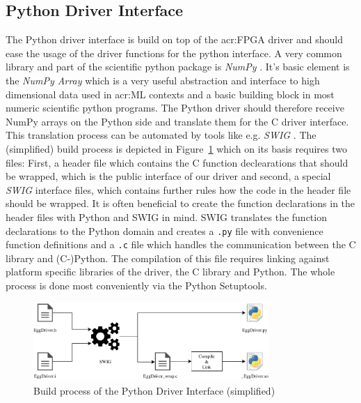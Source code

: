 \subsection{Python Driver Interface}
\label{sec:sw-python}

The Python driver interface is build on top of the \gls{acr:FPGA} driver and should ease the usage of the driver functions for the python interface. A very common library and part of the scientific python package is \emph{NumPy} \cite{Virtanen:2020aa}. It's basic element is the \emph{NumPy Array} \cite{Walt:2011aa} which is a very useful abstraction and interface to high dimensional data used in \gls{acr:ML} contexts and a basic building block in most numeric scientific python programs. The Python driver should therefore receive NumPy arrays on the Python side and translate them for the C driver interface. 
This translation process can be automated by tools like e.g. \emph{SWIG} \cite{Beazley:2003aa}.	The (simplified) build process is depicted in Figure~\ref{fig:sw-python-eggdriver-build} which on its basis requires two files: 
First, a header file which contains the C function declearations that should be wrapped, which is the public interface of our driver and second, a special \emph{SWIG} interface files, which contains further rules how the code in the header file should be wrapped. It is often beneficial to create the function declarations in the header files with Python and SWIG in mind. 
SWIG translates the function declarations to the Python domain and creates a \texttt{.py} file with convenience function definitions and a \texttt{.c} file which handles the communication between the C library and (C-)Python. The compilation of this file requires linking against platform specific libraries of the driver, the C library and Python. The whole process is done most conveniently via the Python Setuptools.

\begin{figure}[hbt]
  \centering
  \includegraphics[width=0.8\textwidth]{img/pydriver.pdf}
  \caption{Build process of the Python Driver Interface (simplified)}
  \label{fig:sw-python-eggdriver-build}
\end{figure}


